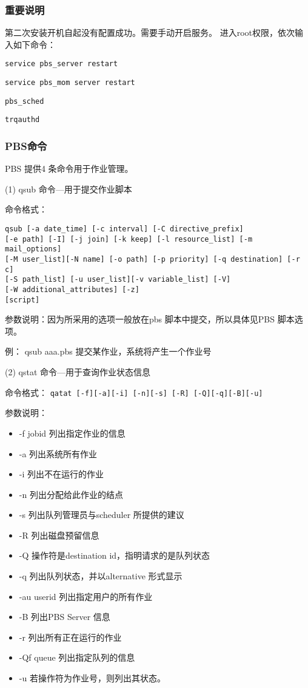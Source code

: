 {\subsubsection{重要说明}
第二次安装开机自起没有配置成功。需要手动开启服务。
进入root权限，依次输入如下命令：

\verb|service pbs_server restart|

\verb|service pbs_mom server restart|

\verb|pbs_sched|

\verb|trqauthd|


\subsubsection{PBS命令}
PBS 提供4 条命令用于作业管理。

(1) qsub 命令—用于提交作业脚本

命令格式：
\begin{verbatim}
qsub [-a date_time] [-c interval] [-C directive_prefix]
[-e path] [-I] [-j join] [-k keep] [-l resource_list] [-m mail_options]
[-M user_list][-N name] [-o path] [-p priority] [-q destination] [-r c]
[-S path_list] [-u user_list][-v variable_list] [-V]
[-W additional_attributes] [-z]
[script]
\end{verbatim}
参数说明：因为所采用的选项一般放在pbs 脚本中提交，所以具体见PBS 脚本选项。

例： qsub aaa.pbs 提交某作业，系统将产生一个作业号

(2) qstat 命令—用于查询作业状态信息

命令格式：
\verb*|qatat [-f][-a][-i] [-n][-s] [-R] [-Q][-q][-B][-u]|

参数说明：
\begin{itemize}
\item -f jobid 列出指定作业的信息
\item -a 列出系统所有作业
\item -i 列出不在运行的作业
\item -n 列出分配给此作业的结点
\item -s 列出队列管理员与scheduler 所提供的建议
\item -R 列出磁盘预留信息
\item -Q 操作符是destination id，指明请求的是队列状态
\item -q 列出队列状态，并以alternative 形式显示
\item -au userid 列出指定用户的所有作业
\item -B 列出PBS Server 信息
\item -r 列出所有正在运行的作业
\item -Qf queue 列出指定队列的信息
\item -u 若操作符为作业号，则列出其状态。
\end{itemize}

}
